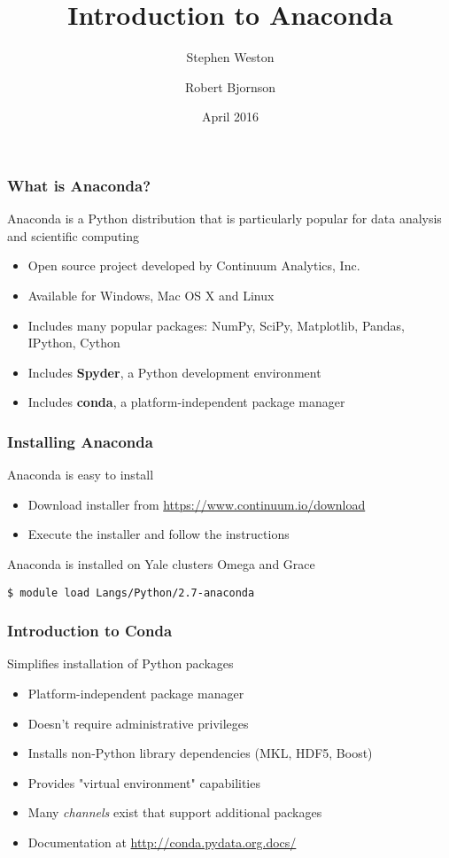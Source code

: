 \documentclass[10pt]{beamer}
\title{Introduction to Anaconda}
\author{{Stephen Weston} \and {Robert Bjornson}}
\institute[Yale]{
  Yale Center for Research Computing \\
  Yale University
}
\date{April 2016}
\begin{document}
\begin{frame}[plain]
  \titlepage
\end{frame}

\begin{frame}
\frametitle{What is Anaconda?}
Anaconda is a Python distribution that is particularly popular
for data analysis and scientific computing
\begin{itemize}
\item Open source project developed by Continuum Analytics, Inc.
\item Available for Windows, Mac OS X and Linux
\item Includes many popular packages:
  NumPy, SciPy, Matplotlib, Pandas, IPython, Cython
\item Includes \textbf{Spyder}, a Python development environment
\item Includes \textbf{conda}, a platform-independent package manager
\end{itemize}
\end{frame}

\begin{frame}[fragile]
\frametitle{Installing Anaconda}
Anaconda is easy to install
\begin{itemize}
\item Download installer from \url{https://www.continuum.io/download}
\item Execute the installer and follow the instructions
\end{itemize}
\vskip10pt
Anaconda is installed on Yale clusters Omega and Grace
\begin{verbatim}
$ module load Langs/Python/2.7-anaconda
\end{verbatim}
\end{frame}

\begin{frame}
\frametitle{Introduction to Conda}
Simplifies installation of Python packages
\begin{itemize}
\item Platform-independent package manager
\item Doesn't require administrative privileges
\item Installs non-Python library dependencies (MKL, HDF5, Boost)
\item Provides "virtual environment" capabilities
\item Many \textit{channels} exist that support additional packages
\item Documentation at \url{http://conda.pydata.org.docs/}
\end{itemize}
\end{frame}
\end{document}
